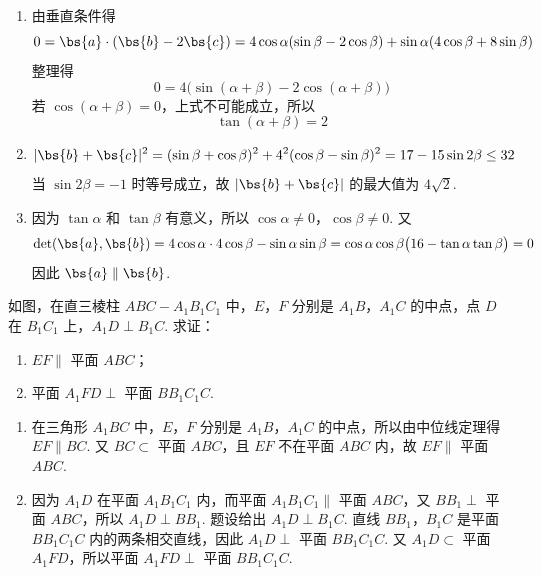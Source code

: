 \begin{solution}
\begin{enumerate}
\item 由垂直条件得
\[
0=\bs{a}\cdot(\bs{b}-2\bs{c})
=4\cos\alpha(\sin\beta-2\cos\beta)
+\sin\alpha(4\cos\beta+8\sin\beta)
\]
整理得
\[
0=4\bigl(\sin(\alpha+\beta)-2\cos(\alpha+\beta)\bigr)
\]
若 \(\cos(\alpha+\beta)=0\)，上式不可能成立，所以
\[
\tan(\alpha+\beta)=2
\]

\item
\[
|\bs{b}+\bs{c}|^2
=(\sin\beta+\cos\beta)^2+4^2(\cos\beta-\sin\beta)^2
=17-15\sin2\beta\le32
\]
当 \(\sin2\beta=-1\) 时等号成立，故 \(|\bs{b}+\bs{c}|\) 的最大值为 \(4\sqrt2\).

\item 因为 \(\tan\alpha\) 和 \(\tan\beta\) 有意义，所以 \(\cos\alpha\ne0\)，\(\cos\beta\ne0\). 又
\[
\det(\bs{a},\bs{b})
=4\cos\alpha\cdot4\cos\beta-\sin\alpha\sin\beta
=\cos\alpha\cos\beta\bigl(16-\tan\alpha\tan\beta\bigr)=0
\]
因此 \(\bs{a}\parallel\bs{b}\).
\end{enumerate}
\end{solution}

\begin{problem}
如图，在直三棱柱 \(ABC-A_1B_1C_1\) 中，\(E\)，\(F\) 分别是 \(A_1B\)，\(A_1C\) 的中点，点 \(D\) 在 \(B_1C_1\) 上，\(A_1D\perp B_1C\). 求证：

\begin{enumerate}
\item \(EF\parallel\) 平面 \(ABC\)；
\item 平面 \(A_1FD\perp\) 平面 \(BB_1C_1C\).
\end{enumerate}

\end{problem}

\begin{solution}
\begin{enumerate}
\item 在三角形 \(A_1BC\) 中，\(E\)，\(F\) 分别是 \(A_1B\)，\(A_1C\) 的中点，所以由中位线定理得 \(EF\parallel BC\). 又 \(BC\subset\) 平面 \(ABC\)，且 \(EF\) 不在平面 \(ABC\) 内，故 \(EF\parallel\) 平面 \(ABC\).

\item 因为 \(A_1D\) 在平面 \(A_1B_1C_1\) 内，而平面 \(A_1B_1C_1\parallel\) 平面 \(ABC\)，又 \(BB_1\perp\) 平面 \(ABC\)，所以 \(A_1D\perp BB_1\). 题设给出 \(A_1D\perp B_1C\). 直线 \(BB_1\)，\(B_1C\) 是平面 \(BB_1C_1C\) 内的两条相交直线，因此 \(A_1D\perp\) 平面 \(BB_1C_1C\). 又 \(A_1D\subset\) 平面 \(A_1FD\)，所以平面 \(A_1FD\perp\) 平面 \(BB_1C_1C\).
\end{enumerate}
\end{solution}

